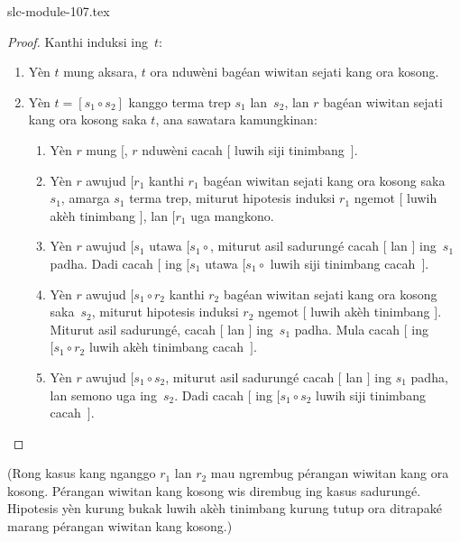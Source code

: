 \begin{filecontents*}[overwrite]{slc-module-107.tex}
\begin{proof}
  Kanthi induksi ing~$t$:
  \begin{enumerate}
  \item Yèn $t$ mung aksara,
    $t$ ora nduwèni bagéan
    wiwitan sejati kang ora kosong.
  \item Yèn $t = [s_1 \circ s_2]$
    kanggo terma trep $s_1$
    lan~$s_2$, lan $r$ bagéan
    wiwitan sejati kang ora kosong
    saka $t$, ana sawatara
    kamungkinan:
    \begin{enumerate}
    \item Yèn $r$ mung $[$,
      $r$ nduwèni cacah $[$
      luwih siji tinimbang~$]$.
    \item Yèn $r$ awujud
      $[r_1$ kanthi $r_1$
      bagéan wiwitan sejati kang ora kosong
      saka~$s_1$, amarga
      $s_1$ terma trep,
      miturut hipotesis
      induksi $r_1$
      ngemot $[$ luwih
      akèh tinimbang $]$,
      lan $[r_1$ uga
      mangkono.
    \item Yèn $r$ awujud
      $[s_1$ utawa
      $[s_1 \circ {}$,
      miturut asil sadurungé
      cacah $[$ lan $]$
      ing~$s_1$ padha.
      Dadi cacah $[$
      ing $[s_1$ utawa
      $[s_1 \circ {}$
      luwih siji tinimbang
      cacah~$]$.
    \item Yèn $r$ awujud
      $[s_1 \circ r_2$
      kanthi $r_2$ bagéan
      wiwitan sejati kang ora kosong
      saka~$s_2$, miturut
      hipotesis induksi
      $r_2$ ngemot $[$
      luwih akèh tinimbang
      $]$. Miturut asil
      sadurungé, cacah $[$
      lan $]$ ing~$s_1$
      padha. Mula cacah $[$
      ing $[s_1 \circ r_2$
      luwih akèh tinimbang
      cacah~$]$.
    \item Yèn $r$ awujud
      $[s_1 \circ s_2$,
      miturut asil sadurungé
      cacah $[$ lan $]$
      ing $s_1$ padha,
      lan semono uga
      ing~$s_2$. Dadi
      cacah $[$ ing
      $[s_1 \circ s_2$
      luwih siji tinimbang
      cacah~$]$.
    \end{enumerate}
  \end{enumerate}
\end{proof}
(Rong kasus kang nganggo $r_1$ lan $r_2$ mau ngrembug pérangan
wiwitan kang ora kosong. Pérangan wiwitan kang kosong wis dirembug
ing kasus sadurungé. Hipotesis yèn kurung bukak luwih akèh tinimbang
kurung tutup ora ditrapaké marang pérangan wiwitan kang kosong.)


\end{filecontents*}

